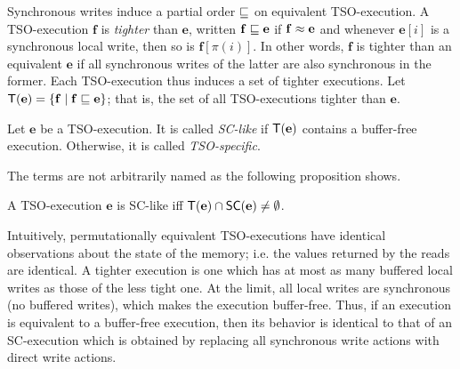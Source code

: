Synchronous writes induce a partial order $\sqsubseteq$ on equivalent TSO-execution.
A TSO-execution $\mathbf{f}$ is {\em tighter} than $\mathbf{e}$, written $\mathbf{f}\sqsubseteq\mathbf{e}$ if $\mathbf{f}\approx\mathbf{e}$ and whenever $\mathbf{e}[i]$ is a synchronous local write, then so is $\mathbf{f}[\pi(i)]$.
In other words, $\mathbf{f}$ is tighter than an equivalent $\mathbf{e}$ if all synchronous writes of the latter are also synchronous in the former. 
Each TSO-execution thus induces a set of tighter executions.
Let $\mathsf{T}(\mathbf{e})=\{\mathbf{f} \mid \mathbf{f}\sqsubseteq\mathbf{e}\}$; that is, the set of all TSO-executions tighter than $\mathbf{e}$.

\begin{definition}[SC-like]\label{def:sc-like}
Let $\mathbf{e}$ be a TSO-execution.
It is called {\em SC-like} if $\mathsf{T}(\mathbf{e})$ contains a buffer-free execution.
Otherwise, it is called {\em TSO-specific}.
\end{definition}
The terms are not arbitrarily named as the following proposition shows.

\begin{proposition}
A TSO-execution $\mathbf{e}$ is SC-like iff $\mathsf{T}(\mathbf{e}) \cap \mathsf{SC}(\mathbf{e}) \neq \emptyset$.
\end{proposition}
Intuitively, permutationally equivalent TSO-executions have identical observations about the state of the memory; i.e. the values returned by the reads are identical.
A tighter execution is one which has at most as many buffered local writes as those of the less tight one. 
At the limit, all local writes are synchronous (no buffered writes), which makes the execution buffer-free.
Thus, if an execution is equivalent to a buffer-free execution, then its behavior is identical to that of an SC-execution which is obtained by replacing all synchronous write actions with direct write actions.

